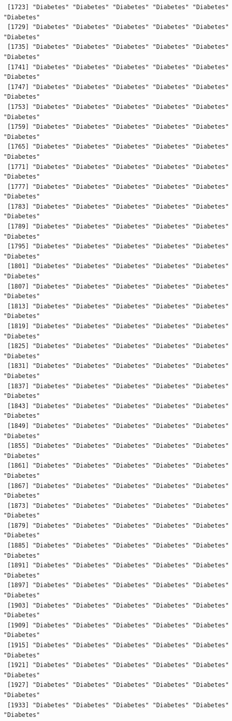 \documentclass[
  letterpaper,
  DIV=11,
  numbers=noendperiod]{scrartcl}
\begin{document}
\begin{verbatim}
 [1723] "Diabetes" "Diabetes" "Diabetes" "Diabetes" "Diabetes" "Diabetes"
 [1729] "Diabetes" "Diabetes" "Diabetes" "Diabetes" "Diabetes" "Diabetes"
 [1735] "Diabetes" "Diabetes" "Diabetes" "Diabetes" "Diabetes" "Diabetes"
 [1741] "Diabetes" "Diabetes" "Diabetes" "Diabetes" "Diabetes" "Diabetes"
 [1747] "Diabetes" "Diabetes" "Diabetes" "Diabetes" "Diabetes" "Diabetes"
 [1753] "Diabetes" "Diabetes" "Diabetes" "Diabetes" "Diabetes" "Diabetes"
 [1759] "Diabetes" "Diabetes" "Diabetes" "Diabetes" "Diabetes" "Diabetes"
 [1765] "Diabetes" "Diabetes" "Diabetes" "Diabetes" "Diabetes" "Diabetes"
 [1771] "Diabetes" "Diabetes" "Diabetes" "Diabetes" "Diabetes" "Diabetes"
 [1777] "Diabetes" "Diabetes" "Diabetes" "Diabetes" "Diabetes" "Diabetes"
 [1783] "Diabetes" "Diabetes" "Diabetes" "Diabetes" "Diabetes" "Diabetes"
 [1789] "Diabetes" "Diabetes" "Diabetes" "Diabetes" "Diabetes" "Diabetes"
 [1795] "Diabetes" "Diabetes" "Diabetes" "Diabetes" "Diabetes" "Diabetes"
 [1801] "Diabetes" "Diabetes" "Diabetes" "Diabetes" "Diabetes" "Diabetes"
 [1807] "Diabetes" "Diabetes" "Diabetes" "Diabetes" "Diabetes" "Diabetes"
 [1813] "Diabetes" "Diabetes" "Diabetes" "Diabetes" "Diabetes" "Diabetes"
 [1819] "Diabetes" "Diabetes" "Diabetes" "Diabetes" "Diabetes" "Diabetes"
 [1825] "Diabetes" "Diabetes" "Diabetes" "Diabetes" "Diabetes" "Diabetes"
 [1831] "Diabetes" "Diabetes" "Diabetes" "Diabetes" "Diabetes" "Diabetes"
 [1837] "Diabetes" "Diabetes" "Diabetes" "Diabetes" "Diabetes" "Diabetes"
 [1843] "Diabetes" "Diabetes" "Diabetes" "Diabetes" "Diabetes" "Diabetes"
 [1849] "Diabetes" "Diabetes" "Diabetes" "Diabetes" "Diabetes" "Diabetes"
 [1855] "Diabetes" "Diabetes" "Diabetes" "Diabetes" "Diabetes" "Diabetes"
 [1861] "Diabetes" "Diabetes" "Diabetes" "Diabetes" "Diabetes" "Diabetes"
 [1867] "Diabetes" "Diabetes" "Diabetes" "Diabetes" "Diabetes" "Diabetes"
 [1873] "Diabetes" "Diabetes" "Diabetes" "Diabetes" "Diabetes" "Diabetes"
 [1879] "Diabetes" "Diabetes" "Diabetes" "Diabetes" "Diabetes" "Diabetes"
 [1885] "Diabetes" "Diabetes" "Diabetes" "Diabetes" "Diabetes" "Diabetes"
 [1891] "Diabetes" "Diabetes" "Diabetes" "Diabetes" "Diabetes" "Diabetes"
 [1897] "Diabetes" "Diabetes" "Diabetes" "Diabetes" "Diabetes" "Diabetes"
 [1903] "Diabetes" "Diabetes" "Diabetes" "Diabetes" "Diabetes" "Diabetes"
 [1909] "Diabetes" "Diabetes" "Diabetes" "Diabetes" "Diabetes" "Diabetes"
 [1915] "Diabetes" "Diabetes" "Diabetes" "Diabetes" "Diabetes" "Diabetes"
 [1921] "Diabetes" "Diabetes" "Diabetes" "Diabetes" "Diabetes" "Diabetes"
 [1927] "Diabetes" "Diabetes" "Diabetes" "Diabetes" "Diabetes" "Diabetes"
 [1933] "Diabetes" "Diabetes" "Diabetes" "Diabetes" "Diabetes" "Diabetes"

\end{verbatim}
\end{document}

